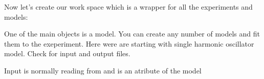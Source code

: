 \documentclass[letterpaper,10pt,english]{sphinxmanual}
\begin{document}
\begin{sphinxVerbatim}[commandchars=\\\{\}]
 
\end{sphinxVerbatim}

Now let’s create our work space which is a wrapper for all the experiments and models:

\begin{sphinxVerbatim}[commandchars=\\\{\}]
  
\end{sphinxVerbatim}

One of the main objects is a model. You can create any number of models and fit them to the exeperiment.
Here were are starting with single harmonic oscillator model. Check  for input and output files.

\begin{sphinxVerbatim}[commandchars=\\\{\}]
    
\end{sphinxVerbatim}

\begin{sphinxVerbatim}[commandchars=\\\{\}]
   
  
  
     
    
\end{sphinxVerbatim}

Input is normally reading from  and is an atribute of the model
\end{document}
